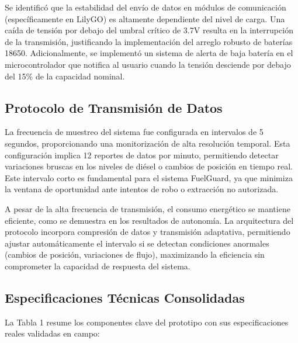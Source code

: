 \documentclass[twocolumn, 10pt]{article}
\begin{document}
Se identificó que la estabilidad del envío de datos en módulos de comunicación (específicamente en LilyGO) es altamente dependiente del nivel de carga. Una caída de tensión por debajo del umbral crítico de 3.7V resulta en la interrupción de la transmisión, justificando la implementación del arreglo robusto de baterías 18650. Adicionalmente, se implementó un sistema de alerta de baja batería en el microcontrolador que notifica al usuario cuando la tensión desciende por debajo del 15\% de la capacidad nominal.

\subsection*{Protocolo de Transmisión de Datos}

La frecuencia de muestreo del sistema fue configurada en intervalos de 5 segundos, proporcionando una monitorización de alta resolución temporal. Esta configuración implica 12 reportes de datos por minuto, permitiendo detectar variaciones bruscas en los niveles de diésel o cambios de posición en tiempo real. Este intervalo corto es fundamental para el sistema FuelGuard, ya que minimiza la ventana de oportunidad ante intentos de robo o extracción no autorizada.

A pesar de la alta frecuencia de transmisión, el consumo energético se mantiene eficiente, como se demuestra en los resultados de autonomía. La arquitectura del protocolo incorpora compresión de datos y transmisión adaptativa, permitiendo ajustar automáticamente el intervalo si se detectan condiciones anormales (cambios de posición, variaciones de flujo), maximizando la eficiencia sin comprometer la capacidad de respuesta del sistema.

\subsection*{Especificaciones Técnicas Consolidadas}

La Tabla 1 resume los componentes clave del prototipo con sus especificaciones reales validadas en campo:
\end{document}

